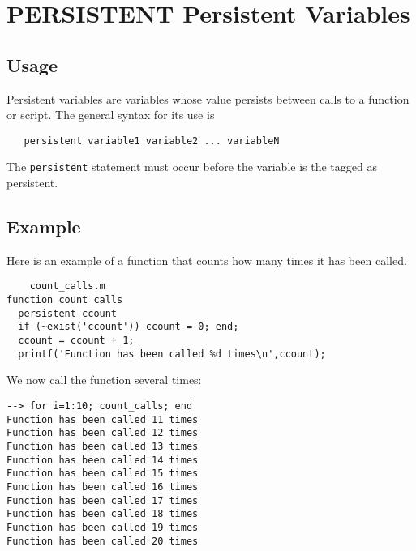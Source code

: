 \section{PERSISTENT Persistent Variables}

\subsection{Usage}

Persistent variables are variables whose value persists between
calls to a function or script.  The general syntax for its
use is
\begin{verbatim}
   persistent variable1 variable2 ... variableN
\end{verbatim}
The \verb|persistent| statement must occur before the variable
is the tagged as persistent.
\subsection{Example}

Here is an example of a function that counts how many
times it has been called.
\begin{verbatim}
    count_calls.m
function count_calls
  persistent ccount
  if (~exist('ccount')) ccount = 0; end;
  ccount = ccount + 1;
  printf('Function has been called %d times\n',ccount);
\end{verbatim}
We now call the function several times:
\begin{verbatim}
--> for i=1:10; count_calls; end
Function has been called 11 times
Function has been called 12 times
Function has been called 13 times
Function has been called 14 times
Function has been called 15 times
Function has been called 16 times
Function has been called 17 times
Function has been called 18 times
Function has been called 19 times
Function has been called 20 times
\end{verbatim}
